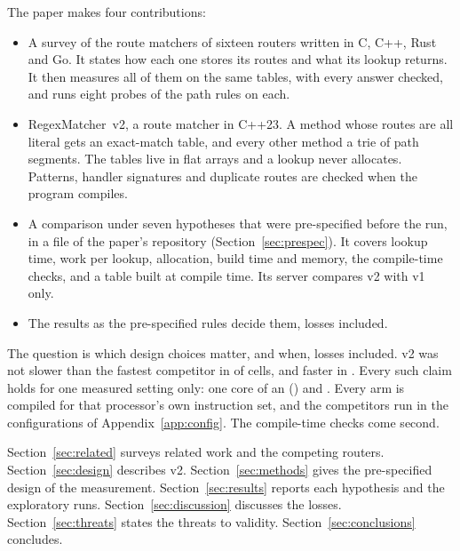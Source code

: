 The paper makes four contributions:
\begin{itemize}
\item A survey of the route matchers of sixteen routers written in C, C++, Rust and Go. It states
how each one stores its routes and what its lookup returns. It then measures all of them on the
same tables, with every answer checked, and runs eight probes of the path rules on each.
\item RegexMatcher~v2, a route matcher in C++23. A method whose routes are all literal gets an
exact-match table, and every other method a trie of path segments. The tables live in flat arrays
and a lookup never allocates. Patterns, handler signatures and duplicate routes are checked when the program compiles.
\item A comparison under seven hypotheses that were pre-specified before the run, in a file of the
paper's repository (Section~\ref{sec:prespec}). It covers lookup time, work per lookup, allocation, build
time and memory, the compile-time checks, and a table built at compile time. Its server compares v2 with v1 only.
\item The results as the pre-specified rules decide them, losses included.
\end{itemize}

The question is which design choices matter, and when, losses included.
v2 was not slower than the fastest competitor in \HOnePassed{}
of \HOneCells{} cells, and faster in \HOneSuperior{}. Every such claim holds for one measured setting
only: one core of an \HostLCpu{} (\HostLArch) and \RunCompiler. Every arm is compiled for that
processor's own instruction set, and the competitors run in the configurations of
Appendix~\ref{app:config}. The compile-time checks come second.

Section~\ref{sec:related} surveys related work and the competing routers.
Section~\ref{sec:design} describes v2. Section~\ref{sec:methods} gives the pre-specified design of
the measurement. Section~\ref{sec:results} reports each hypothesis and the exploratory runs.
Section~\ref{sec:discussion} discusses the losses.
Section~\ref{sec:threats} states the threats to validity.
Section~\ref{sec:conclusions} concludes.
